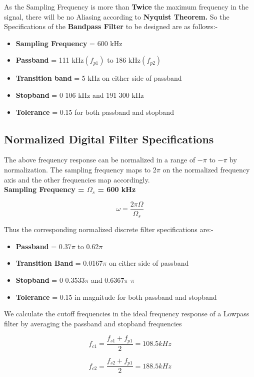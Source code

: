 \documentclass[12pt]{article}
\begin{document}
As the Sampling Frequency is more than \textbf{Twice} the maximum frequency in the signal, there will be no Aliasing according to \textbf{Nyquist Theorem.}
\noindent So the Specifications of the \textbf{Bandpass Filter} to be designed are as follows:-

\begin{itemize}
    \item \textbf{Sampling Frequency} = 600 kHz
    \item \textbf{Passband} = 111 kHz$(f_{p1})$ to 186 kHz$(f_{p2})$
    \item \textbf{Transition band} = 5 kHz on either side of passband
    \item \textbf{Stopband} = 0-106 kHz and 191-300 kHz
    \item \textbf{Tolerance} = 0.15 for both passband and stopband
\end{itemize}

\subsection{Normalized Digital Filter Specifications}
The above frequency response can be normalized in a range of $-\pi$ to $-\pi$ by normalization. The sampling frequency maps to 2$\pi$ on the normalized frequency axis and the other frequencies map accordingly.\\
\textbf{Sampling Frequency = $\Omega_{s}$ = 600 kHz}

\[\omega = \frac{2\pi\Omega}{\Omega_{s}}\]

Thus the corresponding normalized discrete filter specifications are:-
\begin{itemize}
    \item \textbf{Passband} = 0.37$\pi$ to 0.62$\pi$
    \item \textbf{Transition Band} = 0.0167$\pi$ on either side of passband
    \item \textbf{Stopband} = 0-0.3533$\pi$ and 0.6367$\pi$-$\pi$
    \item\textbf{Tolerance} = 0.15 in magnitude for both passband and stopband
\end{itemize}

We calculate the cutoff frequencies in the ideal frequency response of a Lowpass filter by averaging the passband and stopband frequencies

\[f_{c1} = \frac{f_{s1} + f_{p1}}{2} = 108.5 kHz\]

\[f_{c2} = \frac{f_{s2} + f_{p1}}{2} = 188.5 kHz\]
\end{document}
